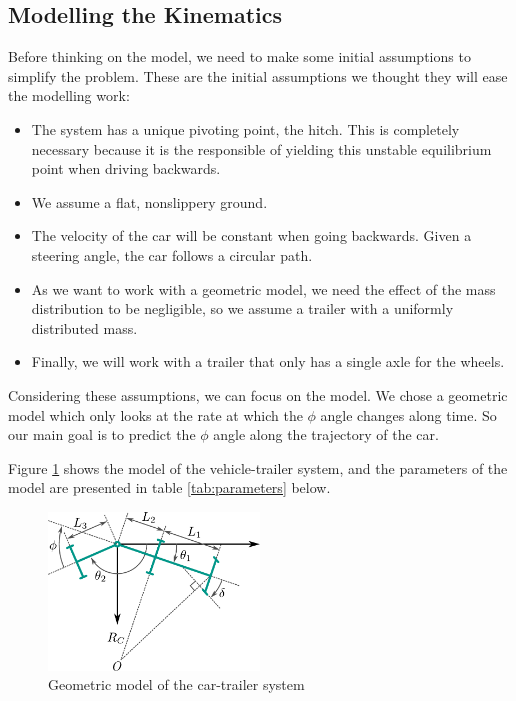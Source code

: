 \subsection{Modelling the Kinematics}\label{sec:kinematics}
\label{kinem}
Before thinking on the model, we need to make some initial assumptions to simplify the problem. These are the initial assumptions we thought they will ease the modelling work: 

\begin{itemize}
    \item The system has a unique pivoting point, the hitch. This is completely necessary because it is the responsible of yielding this unstable equilibrium point when driving backwards. 
    \item We assume a flat, nonslippery ground. 
    \item The velocity of the car will be constant when going backwards. Given a steering angle, the car follows a
    circular path.
    \item As we want to work with a geometric model, we need the effect of the mass distribution to be negligible, so we assume a trailer with a uniformly distributed mass. 
    \item Finally, we will work with a trailer that only has a single axle for the wheels.
\end{itemize}

Considering these assumptions, we can focus on the model. We chose a geometric model which only looks at the rate at which the $\phi$ angle changes along time. So our main goal is to predict the $\phi$ angle along the trajectory of the car. 

Figure \ref{fig:geom-model} shows the model of the vehicle-trailer system, and the parameters of the model are presented in table \ref{tab:parameters} below.
\begin{figure}[H]
    \centering
    \includegraphics[width=0.5\textwidth]{images/trailer-diagram}
    \caption{Geometric model of the car-trailer system}
    \label{fig:geom-model}
\end{figure}

